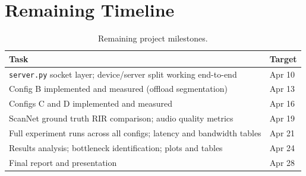 \documentclass[11pt]{article}
\begin{document}
\section{Remaining Timeline}

\begin{table}[H]
\small\centering
\caption{Remaining project milestones.}
\label{tab:timeline}
\begin{tabular}{@{}ll@{}}
\toprule
\textbf{Task} & \textbf{Target}\\
\midrule
\texttt{server.py} socket layer; device/server split working end-to-end & Apr 10\\
Config B implemented and measured (offload segmentation)                & Apr 13\\
Configs C and D implemented and measured                                & Apr 16\\
ScanNet ground truth RIR comparison; audio quality metrics              & Apr 19\\
Full experiment runs across all configs; latency and bandwidth tables   & Apr 21\\
Results analysis; bottleneck identification; plots and tables           & Apr 24\\
Final report and presentation                                           & Apr 28\\
\bottomrule
\end{tabular}
\end{table}
\end{document}
